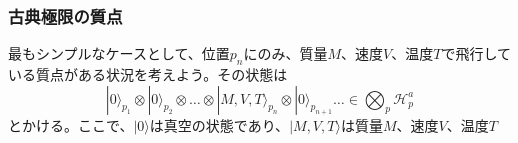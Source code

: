 \subsubsection{古典極限の質点}
最もシンプルなケースとして、位置$p_n$にのみ、質量$M$、速度$V$、温度$T$で飛行している質点がある状況を考えよう。その状態は
\begin{equation}
    |0\rangle_{p_1} \otimes |0\rangle_{p_2} \otimes \ldots \otimes |M,V,T\rangle_{p_n} \otimes |0\rangle_{p_{n+1}} \ldots \in \bigotimes_p \mathcal{H}_p^a
\end{equation}
とかける。ここで、$|0\rangle$は真空の状態であり、$|M,V,T\rangle$は質量$M$、速度$V$、温度$T$